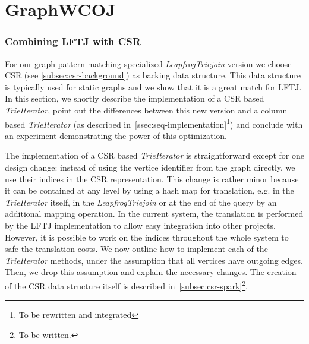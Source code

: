\section{Graph\textsc{WCOJ}} \label{sec:graphtextsc}

\subsubsection{Combining \textsc{LFTJ} with \textsc{CSR}}
For our graph pattern matching specialized \textit{LeapfrogTriejoin} version we choose \textsc{CSR} (see \cref{subsec:csr-background}) as
backing data structure.
This data structure is typically used for static graphs and we show that it is a great match for \textsc{LFTJ}.
In this section, we shortly describe the implementation of a \textsc{CSR} based \textit{TrieIterator}, point out the differences between
this new version and a column based \textit{TrieIterator} (as described in~\cref{ssec:seq-implementation}\footnote{To be rewritten and
integrated}) and conclude with an experiment demonstrating the power of this optimization.

The implementation of a \textsc{CSR} based \textit{TrieIterator} is straightforward except for one design change: instead of using
the vertice identifier from the graph directly, we use their indices in the \textsc{CSR} representation.
This change is rather minor because it can be contained at any level by using a hash map for translation, e.g. in the
\textit{TrieIterator} itself, in the \textit{LeapfrogTriejoin} or at the end of the query by an additional mapping operation.
In the current system, the translation is performed by the \textsc{LFTJ} implementation to allow easy integration into other projects.
However, it is possible to work on the indices throughout the whole system to safe the translation costs.
We now outline how to implement each of the \textit{TrieIterator} methods, under the assumption that all vertices have outgoing edges.
Then, we drop this assumption and explain the necessary changes.
The creation of the \textsc{CSR} data structure itself is described in~\cref{subsec:csr-spark}\footnote{To be
written.}.

